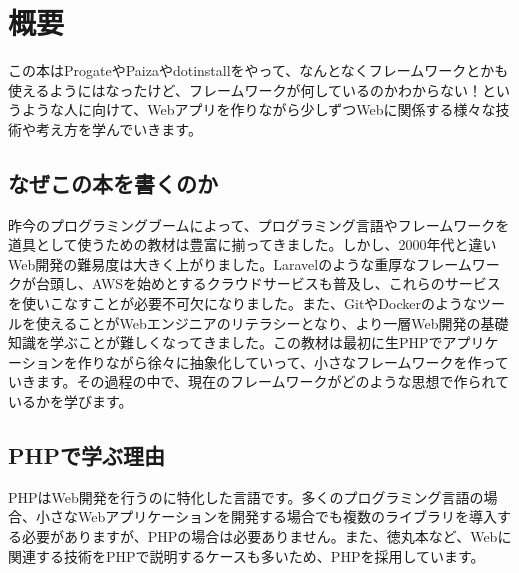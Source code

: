 \chapter*{概要}

この本はProgateやPaizaやdotinstallをやって、なんとなくフレームワークとかも使えるようにはなったけど、フレームワークが何しているのかわからない！というような人に向けて、Webアプリを作りながら少しずつWebに関係する様々な技術や考え方を学んでいきます。
　
\section*{なぜこの本を書くのか}

昨今のプログラミングブームによって、プログラミング言語やフレームワークを道具として使うための教材は豊富に揃ってきました。しかし、2000年代と違いWeb開発の難易度は大きく上がりました。Laravelのような重厚なフレームワークが台頭し、AWSを始めとするクラウドサービスも普及し、これらのサービスを使いこなすことが必要不可欠になりました。また、GitやDockerのようなツールを使えることがWebエンジニアのリテラシーとなり、より一層Web開発の基礎知識を学ぶことが難しくなってきました。この教材は最初に生PHPでアプリケーションを作りながら徐々に抽象化していって、小さなフレームワークを作っていきます。その過程の中で、現在のフレームワークがどのような思想で作られているかを学びます。

\section*{PHPで学ぶ理由}

PHPはWeb開発を行うのに特化した言語です。多くのプログラミング言語の場合、小さなWebアプリケーションを開発する場合でも複数のライブラリを導入する必要がありますが、PHPの場合は必要ありません。また、徳丸本など、Webに関連する技術をPHPで説明するケースも多いため、PHPを採用しています。

